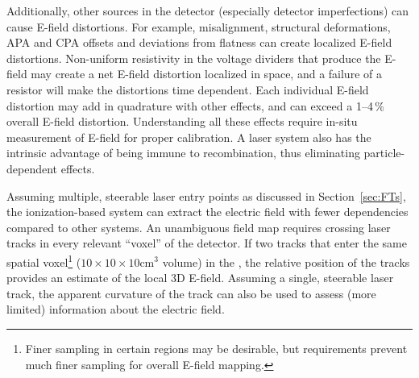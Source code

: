 Additionally, %
other sources in the detector (especially detector imperfections) %
can cause E-field distortions. For example,  misalignment,   structural deformations, APA and CPA offsets and deviations from flatness %
can create localized E-field distortions. %
Non-uniform resistivity in the voltage dividers that produce the E-field may create a net E-field distortion localized in space, and a failure of a  resistor will make the distortions time dependent. 
Each individual E-field distortion may add in quadrature with other effects, and can exceed a \numrange{1}{4}\,\% overall E-field distortion. Understanding all these effects require in-situ measurement of E-field for proper calibration. %
A laser system also has the intrinsic advantage of %
being immune to recombination, thus eliminating particle-dependent effects.  

Assuming multiple, steerable laser entry points as discussed in Section~\ref{sec:FTs}, the ionization-based system can extract the electric field with fewer dependencies compared to other systems. An unambiguous field map requires crossing laser tracks in every relevant “voxel” of the detector. If two tracks that enter the same spatial voxel\footnote{Finer sampling in certain regions may be desirable, but  requirements prevent much finer sampling for overall E-field mapping.} ($10 \times 10 \times 10 \textrm{cm}^3$ volume) in the , the relative position of the tracks provides an estimate of the local 3D E-field. %
Assuming a single, steerable laser track, the apparent curvature of the track can also be used to assess (more limited) information about  the electric field. 
 

